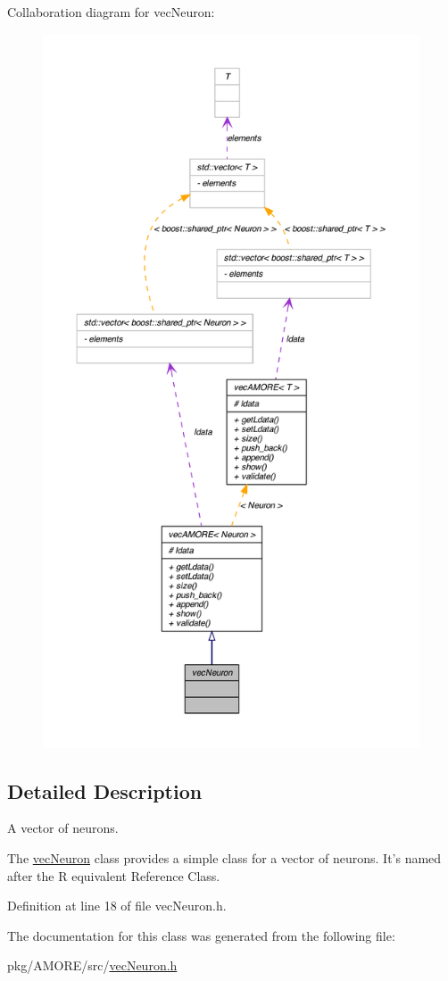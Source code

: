 Collaboration diagram for vecNeuron:
\nopagebreak
\begin{figure}[H]
\begin{center}
\leavevmode
\includegraphics[height=600pt]{classvec_neuron__coll__graph}
\end{center}
\end{figure}


\subsection{Detailed Description}
A vector of neurons. 

The \hyperlink{classvec_neuron}{vecNeuron} class provides a simple class for a vector of neurons. It's named after the R equivalent Reference Class. 

Definition at line 18 of file vecNeuron.h.



The documentation for this class was generated from the following file:\begin{DoxyCompactItemize}
\item 
pkg/AMORE/src/\hyperlink{vec_neuron_8h}{vecNeuron.h}\end{DoxyCompactItemize}
